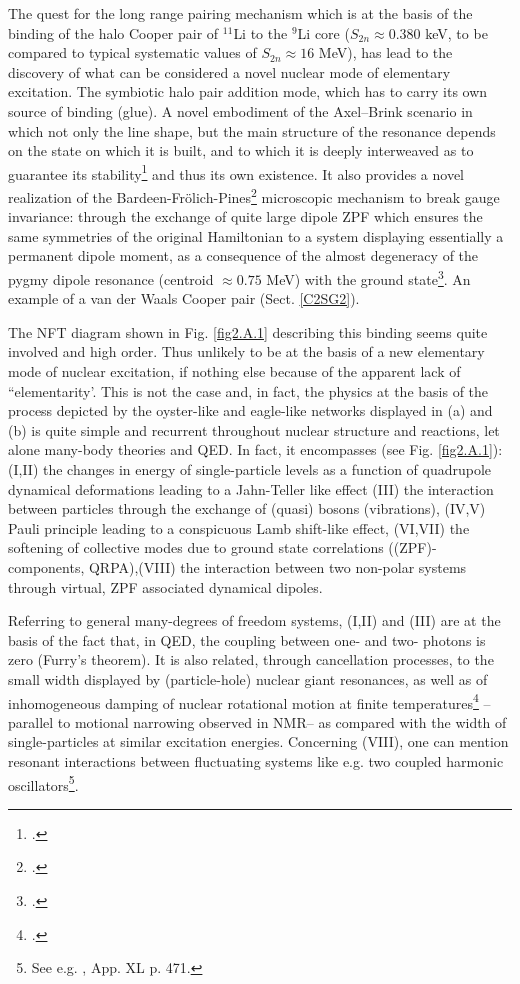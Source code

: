 The quest for the long range pairing mechanism which is at the basis of the binding of the halo Cooper pair of $^{11}$Li to the $^9$Li core ($S_{2n}\approx0.380$ keV, to be compared to typical systematic values of $S_{2n}\approx 16$ MeV), has lead to the discovery of what can be considered a novel nuclear mode of elementary excitation. The symbiotic halo pair addition mode, which has to carry its own source of binding (glue). A novel embodiment of the Axel--Brink scenario in which not only the line shape, but the main structure of the resonance depends on the state on which it is built, and to which it is deeply interweaved as to guarantee its stability\footnote{\cite{Axel:62,Brink:55}.} and thus its own existence. It also provides a novel realization of the Bardeen-Fr\"olich-Pines\footnote{\cite{Bardeen:55,Frohlich:52}.} microscopic mechanism to break gauge invariance: through the exchange of quite large dipole ZPF which ensures the same symmetries of the original Hamiltonian to a system displaying essentially a permanent dipole moment, as a consequence of the almost degeneracy of the  pygmy dipole resonance (centroid $\approx0.75$ MeV) with the ground state\footnote{\cite{Aumann:19}.}. An example of a van der Waals Cooper pair (Sect. \ref{C2SG2}).


The NFT diagram shown in Fig. \ref{fig2.A.1} describing this binding seems quite involved and high order. Thus unlikely to be at the basis of a new elementary mode of nuclear excitation, if nothing else because of the apparent lack of ``elementarity'. This is not the case and, in fact, the physics at the basis of the process depicted by the oyster-like and eagle-like networks displayed in (a) and (b) is quite simple and recurrent throughout nuclear structure and reactions, let alone many-body theories and QED. In fact, it encompasses (see Fig. \ref{fig2.A.1}): (I,II) the changes in energy of single-particle levels as a function of  quadrupole dynamical deformations leading to a Jahn-Teller like effect (III) the interaction between particles through the exchange of (quasi) bosons (vibrations), (IV,V) Pauli principle leading to a conspicuous Lamb shift-like effect, (VI,VII) the softening of collective modes due to ground state correlations ((ZPF)-components, QRPA),(VIII) the interaction between two non-polar systems through virtual, ZPF associated dynamical dipoles.


 Referring to general many-degrees of freedom systems, (I,II) and (III) are at the basis of the fact that, in QED, the coupling between one- and two- photons is zero (Furry's theorem). It is also related, through cancellation processes, to the small width displayed by (particle-hole) nuclear giant resonances, as well as of inhomogeneous damping of nuclear  rotational motion at finite temperatures\footnote{\cite{Broglia:87}.} --parallel to motional narrowing observed in NMR--  as compared with the  width of single-particles at  similar excitation energies. Concerning (VIII), one can mention resonant interactions between fluctuating systems like e.g. two coupled harmonic oscillators\footnote{See e.g. \cite{Born:69}, App. XL p. 471.}. 


